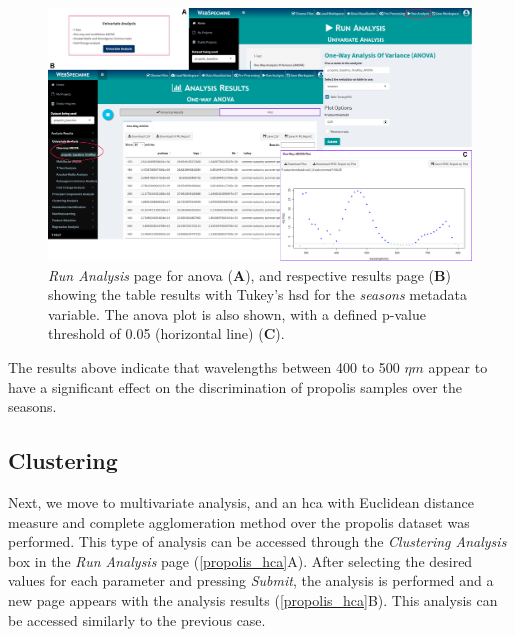 \begin{figure}[H]
	\centering
	\includegraphics[width=1\linewidth]{Imagens/Propolis/anova}
	\caption{\textit{Run Analysis} page for \gls{anova} (\textbf{A}), and respective results page (\textbf{B}) showing the table results with Tukey's \gls{hsd} for the \textit{seasons} metadata variable. The \gls{anova} plot is also shown, with a defined p-value threshold of 0.05 (horizontal line) (\textbf{C}).}
	\label{propolis_anova}
\end{figure}

The results above indicate that wavelengths between 400 to 500 $\eta m$  appear to have a significant effect on the discrimination of propolis samples over the seasons.

\subsection{Clustering}

Next, we move to multivariate analysis, and an \acrlong{hca} with Euclidean distance measure and complete agglomeration method over the propolis dataset was performed. This type of analysis can be accessed through the \textit{Clustering Analysis} box in the \textit{Run Analysis} page (\autoref{propolis_hca}A). After selecting the desired values for each parameter and pressing \textit{Submit}, the analysis is performed and a new page appears with the analysis results (\autoref{propolis_hca}B). This analysis can be accessed similarly to the previous case.

